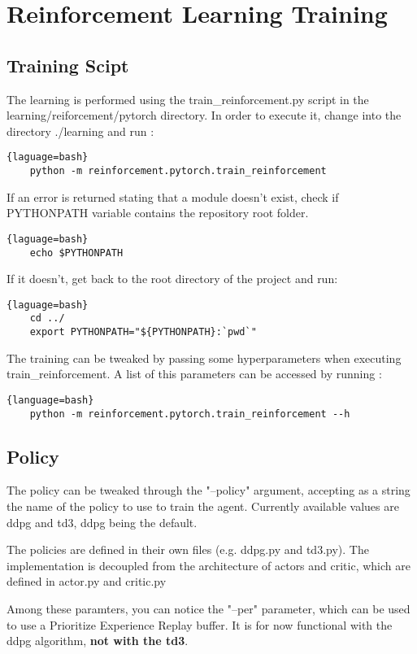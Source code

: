 \chapter{Reinforcement Learning Training}%

\section{Training Scipt}%

The learning is performed using the train\_reinforcement.py script in the learning/reiforcement/pytorch directory.
In order to execute it, change into the directory ./learning and run :

\begin{lstlisting}{laguage=bash}
    python -m reinforcement.pytorch.train_reinforcement
\end{lstlisting}

If an error is returned stating that a module doesn't exist, check if PYTHONPATH variable contains the repository root folder.

\begin{lstlisting}{laguage=bash}
    echo $PYTHONPATH
\end{lstlisting}

If it doesn't, get back to the root directory of the project and run:

\begin{lstlisting}{laguage=bash}
    cd ../
    export PYTHONPATH="${PYTHONPATH}:`pwd`"
\end{lstlisting}

The training can be tweaked by passing some hyperparameters when executing train\_reinforcement.
A list of this parameters can be accessed by running :

\begin{lstlisting}{language=bash}
    python -m reinforcement.pytorch.train_reinforcement --h
\end{lstlisting}

\section{Policy}%

The policy can be tweaked through the "--policy" argument, accepting as a string the name of the policy to use to train the agent.
Currently available values are ddpg\cite{ddpg} and td3\cite{td3}, ddpg being the default.

The policies are defined in their own files (e.g. ddpg.py and td3.py).
The implementation is decoupled from the architecture of actors and critic, which are defined in actor.py and critic.py

Among these paramters, you can notice the "--per" parameter, which can be used to use a Prioritize Experience Replay buffer.
It is for now functional with the ddpg algorithm, \textbf{not with the td3}.



